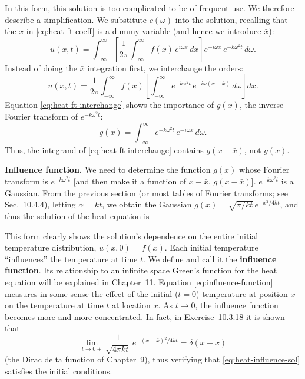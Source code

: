 In this form, this solution is too complicated to be of frequent use.  We therefore describe a simplification.  We substitute $c(\omega)$ into the solution, recalling that the $x$ in \eqref{eq:heat-ft-coeff} is a dummy variable (and hence we introduce $\bar{x}$):
\[
u(x,t) = \int_{-\infty}^{\infty}\left[\frac{1}{2\pi}\int_{-\infty}^{\infty} f(\bar{x})\,e^{i\omega\bar{x}}\,d\bar{x}\right]e^{-i\omega x}\,e^{-k\omega^2 t}\,d\omega.
\]
Instead of doing the $\bar{x}$ integration first, we interchange the orders:
\begin{equation}
\label{eq:heat-ft-interchange}
u(x,t) = \frac{1}{2\pi}\int_{-\infty}^{\infty} f(\bar{x})\left[\int_{-\infty}^{\infty} e^{-k\omega^2 t}\,e^{-i\omega(x-\bar{x})}\,d\omega\right]d\bar{x}.
\end{equation}
Equation \eqref{eq:heat-ft-interchange} shows the importance of $g(x)$, the inverse Fourier transform of $e^{-k\omega^2 t}$:
\begin{equation}
\label{eq:heat-g-def}
g(x) = \int_{-\infty}^{\infty} e^{-k\omega^2 t}\,e^{-i\omega x}\,d\omega.
\end{equation}
Thus, the integrand of \eqref{eq:heat-ft-interchange} contains $g(x-\bar{x})$, not $g(x)$.

\textbf{Influence function.}  We need to determine the function $g(x)$ whose Fourier transform is $e^{-k\omega^2 t}$ [and then make it a function of $x-\bar{x}$, $g(x-\bar{x})$].  $e^{-k\omega^2 t}$ is a Gaussian.  From the previous section (or most tables of Fourier transforms; see Sec.~10.4.4), letting $\alpha = kt$, we obtain the Gaussian $g(x) = \sqrt{\pi/kt}\,e^{-x^2/4kt}$, and thus the solution of the heat equation is

This form clearly shows the solution's dependence on the entire initial temperature distribution, $u(x,0) = f(x)$.  Each initial temperature ``influences'' the temperature at time $t$.  We define
and call it the \textbf{influence function}.  Its relationship to an infinite space Green's function for the heat equation will be explained in Chapter~11.  Equation \eqref{eq:influence-function} measures in some sense the effect of the initial ($t=0$) temperature at position $\bar{x}$ on the temperature at time $t$ at location $x$.  As $t \to 0$, the influence function becomes more and more concentrated.  In fact, in Exercise~10.3.18 it is shown that
\[
\lim_{t\to 0+}\frac{1}{\sqrt{4\pi kt}}\,e^{-(x-\bar{x})^2/4kt} = \delta(x-\bar{x})
\]
(the Dirac delta function of Chapter~9), thus verifying that \eqref{eq:heat-influence-sol} satisfies the initial conditions.

